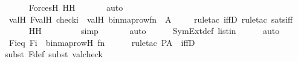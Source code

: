 \begin{isabellebody}
\ \ \ \ \isamarkupfalse%
\ ForcesH{}\ HH\ \isanewline
\ \ \ \ \isamarkupfalse%
\ auto\isanewline
\ \ \isamarkupfalse%
\ \isamarkupfalse%
\ {\isachardoublequoteopen}val{\isacharparenleft}{\kern0pt}H{\isacharcomma}{\kern0pt}\ F{\isacharprime}{\kern0pt}{\isacharparenright}{\kern0pt}{\isacharbackquote}{\kern0pt}val{\isacharparenleft}{\kern0pt}H{\isacharcomma}{\kern0pt}\ check{\isacharparenleft}{\kern0pt}i{\isacharparenright}{\kern0pt}{\isacharparenright}{\kern0pt}\ {\isacharequal}{\kern0pt}\ val{\isacharparenleft}{\kern0pt}H{\isacharcomma}{\kern0pt}\ binmap{\isacharunderscore}{\kern0pt}row{\isacharprime}{\kern0pt}{\isacharparenleft}{\kern0pt}f{\isacharbackquote}{\kern0pt}n{\isacharparenright}{\kern0pt}{\isacharparenright}{\kern0pt}{\isachardoublequoteclose}\ {\isacharparenleft}{\kern0pt}\ {\isacharquery}{\kern0pt}A{\isacharparenright}{\kern0pt}\isanewline
\ \ \ \ \isamarkupfalse%
{\isacharparenleft}{\kern0pt}rule{\isacharunderscore}{\kern0pt}tac\ iffD{}{\isacharcomma}{\kern0pt}\ rule{\isacharunderscore}{\kern0pt}tac\ sats{\isacharunderscore}{\kern0pt}{\isasymphi}{\isacharunderscore}{\kern0pt}iff{\isacharparenright}{\kern0pt}\isanewline
\ \ \ \ \isamarkupfalse%
\ HH\ \isanewline
\ \ \ \ \ \ \isamarkupfalse%
\ simp\isanewline
\ \ \ \ \ \isamarkupfalse%
\ auto{\isacharbrackleft}{\kern0pt}{}{\isacharbrackright}{\kern0pt}\isanewline
\ \ \ \ \isamarkupfalse%
\ SymExt{\isacharunderscore}{\kern0pt}def\ listin{\isacharprime}{\kern0pt}{\isacharprime}{\kern0pt}{\isacharprime}{\kern0pt}\isanewline
\ \ \ \ \isamarkupfalse%
\ auto\isanewline
\ \ \isamarkupfalse%
\ \isamarkupfalse%
\ Fieq{}{\isacharcolon}{\kern0pt}\ {\isachardoublequoteopen}F{\isacharbackquote}{\kern0pt}i\ {\isacharequal}{\kern0pt}\ binmap{\isacharunderscore}{\kern0pt}row{\isacharparenleft}{\kern0pt}H{\isacharcomma}{\kern0pt}\ f{\isacharbackquote}{\kern0pt}n{\isacharparenright}{\kern0pt}{\isachardoublequoteclose}\ \isanewline
\ \ \ \ \isamarkupfalse%
{\isacharparenleft}{\kern0pt}rule{\isacharunderscore}{\kern0pt}tac\ P{\isacharequal}{\kern0pt}{\isachardoublequoteopen}{\isacharquery}{\kern0pt}A{\isachardoublequoteclose}\ \ iffD{}{\isacharparenright}{\kern0pt}\isanewline
\ \ \ \ \ \isamarkupfalse%
{\isacharparenleft}{\kern0pt}subst\ F{\isacharunderscore}{\kern0pt}def{\isacharcomma}{\kern0pt}\ subst\ valcheck{\isacharparenright}{\kern0pt}\isanewline

\end{isabellebody}

